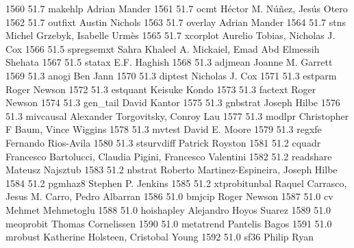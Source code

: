   1560     51.7    makehlp       Adrian Mander                           
  1561     51.7    ocmt          Héctor M. Núñez, Jesús Otero        
  1562     51.7    outfixt       Austin Nichols                          
  1563     51.7    overlay       Adrian Mander                           
  1564     51.7    stns          Michel Grzebyk, Isabelle Urmès         
  1565     51.7    xcorplot      Aurelio Tobias, Nicholas J. Cox         
  1566     51.5    spregsemxt    Sahra Khaleel A. Mickaiel, Emad Abd     
                                   Elmessih Shehata                        
  1567     51.5    statax        E.F. Haghish                            
  1568     51.3    adjmean       Joanne M. Garrett                       
  1569     51.3    anogi         Ben Jann                                
  1570     51.3    diptest       Nicholas J. Cox                         
  1571     51.3    estparm       Roger Newson                            
  1572     51.3    estquant      Keisuke Kondo                           
  1573     51.3    factext       Roger Newson                            
  1574     51.3    gen_tail      David Kantor                            
  1575     51.3    gnbstrat      Joseph Hilbe                            
  1576     51.3    mivcausal     Alexander Torgovitsky, Conroy Lau       
  1577     51.3    modlpr        Christopher F Baum, Vince Wiggins       
  1578     51.3    mvtest        David E. Moore                          
  1579     51.3    regxfe        Fernando Rios-Avila                     
  1580     51.3    stsurvdiff    Patrick Royston                         
  1581     51.2    cquadr        Francesco Bartolucci, Claudia Pigini,   
                                   Francesco Valentini                     
  1582     51.2    readshare     Mateusz Najsztub                        
  1583     51.2    nbstrat       Roberto Martinez-Espineira, Joseph Hilbe
  1584     51.2    pgmhaz8       Stephen P. Jenkins                      
  1585     51.2    xtprobitunbal  Raquel Carrasco, Jesus M. Carro, Pedro  
                                   Albarran                                
  1586     51.0    bmjcip        Roger Newson                            
  1587     51.0    cv            Mehmet Mehmetoglu                       
  1588     51.0    hoishapley    Alejandro Hoyos Suarez                  
  1589     51.0    meoprobit     Thomas Cornelissen                      
  1590     51.0    metatrend     Pantelis Bagos                          
  1591     51.0    mrobust       Katherine Holsteen, Cristobal Young     
  1592     51.0    sf36          Philip Ryan                             
